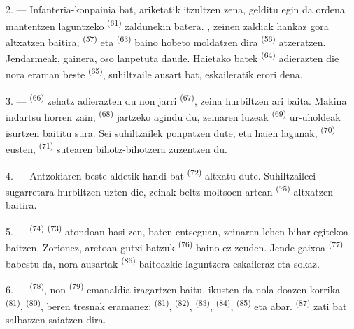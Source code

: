 2. --- Infanteria-konpainia bat, ariketatik itzultzen zena, gelditu egin da
ordena mantentzen laguntzeko  \textsuperscript{(61)}
zaldunekin batera. , zeinen zaldiak hankaz gora altxatzen
baitira,  \textsuperscript{(57)} eta 
\textsuperscript{(63)} baino hobeto moldatzen dira 
\textsuperscript{(56)} atzeratzen. Jendarmeak, gainera, oso lanpetuta daude.
Haietako batek  \textsuperscript{(64)} adierazten die nora eraman
beste  \textsuperscript{(65)}, suhiltzaile ausart bat, eskaileratik
erori dena.

3. ---  \textsuperscript{(66)} zehatz adierazten du non jarri
 \textsuperscript{(67)}, zeina hurbiltzen ari baita. Makina
indartsu horren zain,  \textsuperscript{(68)} jartzeko agindu
du, zeinaren  luzeak \textsuperscript{(69)} ur-uholdeak isurtzen
baititu sura. Sei suhiltzailek ponpatzen dute, eta haien lagunak,
 \textsuperscript{(70)} eusten, 
\textsuperscript{(71)} sutearen bihotz-bihotzera zuzentzen du.

4. --- Antzokiaren beste aldetik  handi bat
\textsuperscript{(72)} altxatu dute. Suhiltzaileei sugarretara hurbiltzen uzten
die, zeinak  beltz moltsoen artean \textsuperscript{(75)}
altxatzen baitira.

\VUsaut{5.0mm}
\VUsaut{3.4mm}

5. ---  \textsuperscript{(74)} 
\textsuperscript{(73)} atondoan hasi zen,  baten entseguan, zeinaren
lehen  bihar egitekoa baitzen. Zorionez, aretoan
 gutxi batzuk \textsuperscript{(76)} baino ez zeuden. Jende gaixoa
 \textsuperscript{(77)} babestu da, nora 
ausartak \textsuperscript{(86)} baitoazkie laguntzera eskaileraz eta sokaz.

6. ---  \textsuperscript{(78)}, non 
\textsuperscript{(79)} emanaldia iragartzen baitu, ikusten da nola doazen korrika
 \textsuperscript{(81)}, 
\textsuperscript{(80)}, beren tresnak eramanez: 
\textsuperscript{(81)},  \textsuperscript{(82)},
 \textsuperscript{(83)}, 
\textsuperscript{(84)},  \textsuperscript{(85)} eta abar.
 \textsuperscript{(87)} zati bat salbatzen saiatzen dira.


